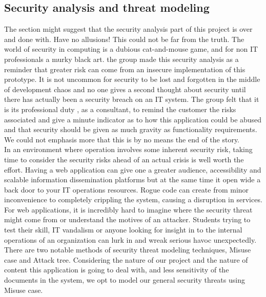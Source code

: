 \subsection{Security analysis and threat modeling}
The section might suggest that the security analysis part of this project is over and done with. Have no allusions! This could not be far from the truth. The world of security in computing is a dubious cat-and-mouse game, and for non IT professionals a murky black art.  the group made this security analysis as a reminder that greater risk can come from an insecure implementation of this prototype. It is not uncommon for security to be lost and forgotten in the middle of development chaos and no one gives a second thought about security until there has actually been a security breach on an IT system.  The group felt that it is its professional duty , as a consultant, to  remind the customer  the risks associated and give a minute  indicator as to how this application could be abused and that security should be given as much gravity as functionality requirements. We could not emphasis more that this is by no means the end of the story.
\\[0.2cm]
In an environment where operation involves some inherent security risk, taking time to consider the security risks ahead of an actual crisis is well worth the effort. Having a web application can give one a greater audience, accessibility and scalable information dissemination platforms but at the same time it open wide a back door to your IT operations resources. Rogue code can create from minor inconvenience to completely crippling the system, causing a disruption in services. For web applications, it is incredibly hard to imagine where the security threat might come from or understand the motives of an attacker. Students trying to test their skill, IT vandalism or anyone looking for insight in to the internal operations of an organization can lurk in and wreak serious havoc unexpectedly.
\\[0.5cm]
There are two notable methods of security threat modeling techniques, Misuse case and Attack tree. Considering the nature of our project and the nature of content this application is going to deal with, and less sensitivity of the documents in the system, we opt to model our general security threats using Misuse case.
